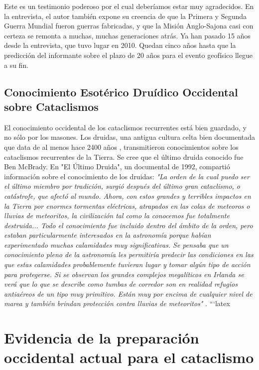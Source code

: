 \documentclass[10pt,twocolumn,letterpaper]{article}
\begin{document}
Este es un testimonio poderoso por el cual deberíamos estar muy agradecidos. En la entrevista, el autor también expone su creencia de que la Primera y Segunda Guerra Mundial fueron guerras fabricadas, y que la Misión Anglo-Sajona casi con certeza se remonta a muchas, muchas generaciones atrás. Ya han pasado 15 años desde la entrevista, que tuvo lugar en 2010. Quedan cinco años hasta que la predicción del informante sobre el plazo de 20 años para el evento geofísico llegue a su fin.

\subsection{Conocimiento Esotérico Druídico Occidental sobre Cataclismos}

El conocimiento occidental de los cataclismos recurrentes está bien guardado, y no sólo por los masones. Los druidas, una antigua cultura celta bien documentada que data de al menos hace 2400 años \cite{7}, transmitieron conocimientos sobre los cataclismos recurrentes de la Tierra. Se cree que el último druida conocido fue Ben McBrady. En "El Último Druida", un documental de 1992, compartió información sobre el conocimiento de los druidas: \textit{"La orden de la cual puedo ser el último miembro por tradición, surgió después del último gran cataclismo, o catástrofe, que afectó al mundo. Ahora, con estos grandes y terribles impactos en la Tierra por enormes tormentas eléctricas, atrapados en las colas de meteoros o lluvias de meteoritos, la civilización tal como la conocemos fue totalmente destruida... Todo el conocimiento fue incluido dentro del ámbito de la orden, pero estaban particularmente interesados en la astronomía porque habían experimentado muchas calamidades muy significativas. Se pensaba que un conocimiento pleno de la astronomía les permitiría predecir las condiciones en las que estas calamidades probablemente tuvieran lugar y tomar algún tipo de acción para protegerse. Si se observan los grandes complejos megalíticos en Irlanda se verá que lo que se describe como tumbas de corredor son en realidad refugios antiaéreos de un tipo muy primitivo. Están muy por encima de cualquier nivel de marea y también brindan protección contra lluvias de meteoritos"} \cite{8,9}.
```latex

\section{Evidencia de la preparación occidental actual para el cataclismo}
\end{document}
